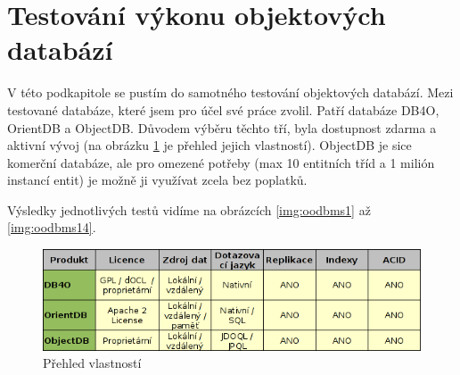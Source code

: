 \section{Testování výkonu objektových databází}
V této podkapitole se pustím do samotného testování objektových databází. Mezi testované databáze, které jsem pro účel své práce zvolil. Patří databáze DB4O, OrientDB a ObjectDB. Důvodem výběru těchto tří, byla dostupnost zdarma a aktivní vývoj (na obrázku \ref{img:oodbms:comp} je přehled jejich vlastností). ObjectDB je sice komerční databáze, ale pro omezené potřeby (max 10 entitních tříd a 1 milión instancí entit) je možně ji využívat zcela bez poplatků.

Výsledky jednotlivých testů vidíme na obrázcích \ref{img:oodbms1} až \ref{img:oodbms14}.

\begin{figure}[!h]
  \includegraphics[width=38em]{obr/oodbms_comp}
  \caption{Přehled vlastností}\label{img:oodbms:comp}
\end{figure}

